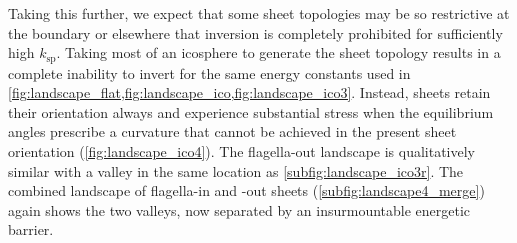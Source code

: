 Taking this further, we expect that some sheet topologies may be so restrictive at the boundary or elsewhere that inversion is completely prohibited for sufficiently high $k_{\text{sp}}$. 
Taking most of an icosphere to generate the sheet topology results in a complete inability to invert for the same energy constants used in \cref{fig:landscape_flat,fig:landscape_ico,fig:landscape_ico3}.
Instead, sheets retain their orientation always and experience substantial stress when the equilibrium angles prescribe a curvature that cannot be achieved in the present sheet orientation (\cref{fig:landscape_ico4}).
The flagella-out landscape is qualitatively similar with a valley in the same location as \cref{subfig:landscape_ico3r}.
The combined landscape of flagella-in and -out sheets (\cref{subfig:landscape4_merge}) again shows the two valleys, now separated by an insurmountable energetic barrier.

